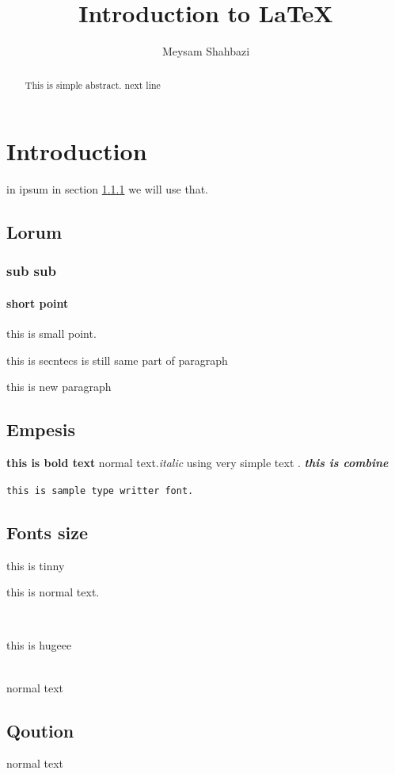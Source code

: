 \documentclass[a4paper,twocolumn]{article}
\title{Introduction to \LaTeX}
\author{Meysam Shahbazi}
\begin{document}
\maketitle
\begin{abstract}
	
This is simple abstract.
next line 
	\lipsum[1]
	
\end{abstract}
\section{Introduction}
in ipsum in section \ref{sec:sub sub} we will use that.
\subsection{Lorum}
\lipsum[1]
\subsubsection{sub sub}\label{sec:sub sub}
\lipsum[1]
\paragraph{short point}
this is small point. 
\EUR


this is secntecs is still same part of paragraph

this is new paragraph
\subsection{Empesis}
\textbf{this is bold text} normal text.\textit{italic}
using very simple text .
\textbf{\textit{this is combine}}

{\tt this is sample type writter font.}
\subsection{Fonts size }
{\tiny this is tinny}  \\
\begin{normalsize}
this is normal text.
\end{normalsize} \\
\begin{huge}
	this is hugeee
\end{huge} \\
normal text
\subsection{Qoution}
normal text 
\end{document}
